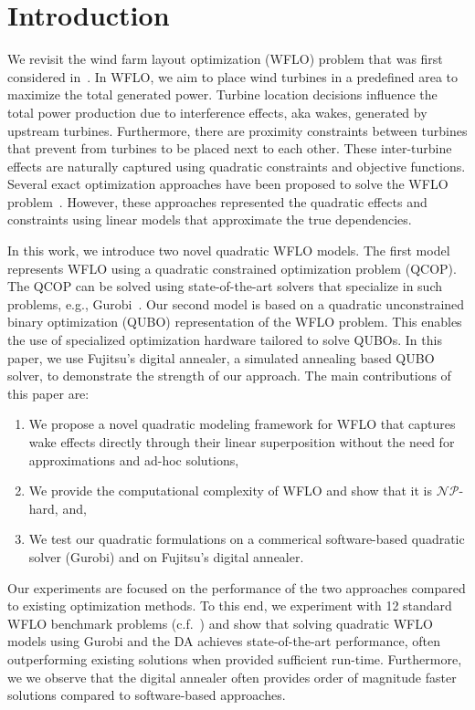 \documentclass[preprint,12pt]{elsarticle}
\begin{document}
\maketitle 

\section{Introduction}
We revisit 
the wind farm layout optimization (WFLO) problem 
that was first considered 
in~\citet{MOSETTI1994105}. 
In WFLO, we aim to place wind turbines 
in a predefined area to maximize 
the total generated power. 
Turbine location decisions    
influence
the
total power production due to  
interference effects, aka wakes, generated by upstream 
turbines. Furthermore, 
there are proximity constraints between turbines
that prevent from turbines to be placed next to each other.
These inter-turbine effects 
are naturally captured using quadratic constraints and objective
functions. Several exact optimization approaches have 
been proposed to solve
the WFLO problem~\cite{turner2014new,Zhang2014}. However, these
approaches represented the quadratic effects and constraints
using linear models that approximate the true dependencies. 

In this work, we introduce two 
novel quadratic WFLO models. The first model 
represents WFLO using a 
quadratic constrained optimization problem (QCOP). 
The QCOP can be solved using state-of-the-art solvers that
specialize in such problems, e.g., Gurobi~\cite{gurobi}. 
Our second model is based on a quadratic unconstrained binary optimization (QUBO) representation of the WFLO 
problem.
This enables the use of specialized optimization hardware tailored to solve
QUBOs. In this paper, we use Fujitsu's digital annealer, a simulated annealing based QUBO solver, to demonstrate the strength
of our approach. The main contributions of this paper are: 
\begin{enumerate} 
\item We propose a novel quadratic modeling framework for WFLO that captures wake 
effects directly through their linear superposition 
without the need for approximations and ad-hoc solutions,
\item We provide the computational complexity of WFLO and show that it is $\mathcal{NP}$-hard, and, 
\item We test our quadratic formulations
on a commerical software-based quadratic solver (Gurobi) and on Fujitsu's digital 
annealer. 
\end{enumerate} Our experiments are focused on the performance of the two approaches
compared to 
existing optimization methods. To this end,
we experiment with 12 standard WFLO benchmark problems (c.f.~\cite{turner2014new})
and show that solving quadratic WFLO models
using Gurobi and the DA
achieves state-of-the-art performance, often outperforming
existing solutions when provided sufficient run-time. Furthermore, we
we observe that the digital 
annealer often provides order of magnitude faster solutions
compared to software-based approaches.
\end{document}

